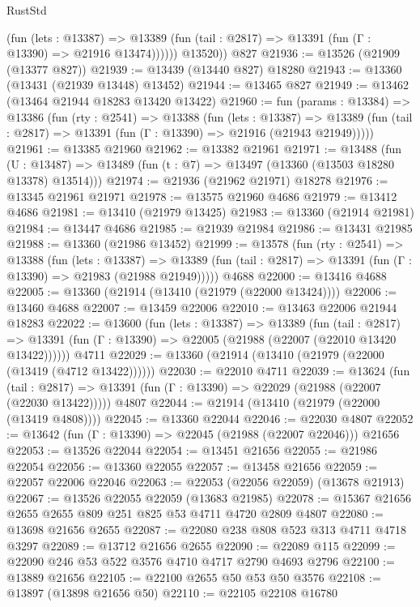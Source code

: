 \begin{lexlean}{RustStd}
\begin{coremodule}
              (fun (lets : @13387) =>
              @13389 (fun (tail : @2817) => @13391 (fun (Γ : @13390) => @21916 @13474))))))
        @13520))
    @827
@21936 := @13526 (@21909 (@13377 @827))
@21939 := @13439 (@13440 @827) @18280
@21943 := @13360 (@13431 (@21939 @13448) @13452)
@21944 := @13465 @827
@21949 := @13462 (@13464 @21944 @18283 @13420 @13422)
@21960 := fun (params : @13384) =>
  @13386
    (fun (rty : @2541) =>
    @13388
      (fun (lets : @13387) =>
      @13389 (fun (tail : @2817) => @13391 (fun (Γ : @13390) => @21916 (@21943 @21949)))))
@21961 := @13385 @21960
@21962 := @13382 @21961
@21971 := @13488
    (fun (U : @13487) => @13489 (fun (t : @7) => @13497 (@13360 (@13503 @18280 @13378) @13514)))
@21974 := @21936 (@21962 @21971) @18278
@21976 := @13345 @21961 @21971
@21978 := @13575 @21960 @4686
@21979 := @13412 @4686
@21981 := @13410 (@21979 @13425)
@21983 := @13360 (@21914 @21981)
@21984 := @13447 @4686
@21985 := @21939 @21984
@21986 := @13431 @21985
@21988 := @13360 (@21986 @13452)
@21999 := @13578
    (fun (rty : @2541) =>
    @13388
      (fun (lets : @13387) =>
      @13389 (fun (tail : @2817) => @13391 (fun (Γ : @13390) => @21983 (@21988 @21949)))))
    @4688
@22000 := @13416 @4688
@22005 := @13360 (@21914 (@13410 (@21979 (@22000 @13424))))
@22006 := @13460 @4688
@22007 := @13459 @22006
@22010 := @13463 @22006 @21944 @18283
@22022 := @13600
    (fun (lets : @13387) =>
    @13389
      (fun (tail : @2817) =>
      @13391 (fun (Γ : @13390) => @22005 (@21988 (@22007 (@22010 @13420 @13422))))))
    @4711
@22029 := @13360 (@21914 (@13410 (@21979 (@22000 (@13419 (@4712 @13422))))))
@22030 := @22010 @4711
@22039 := @13624
    (fun (tail : @2817) => @13391 (fun (Γ : @13390) => @22029 (@21988 (@22007 (@22030 @13422)))))
    @4807
@22044 := @21914 (@13410 (@21979 (@22000 (@13419 @4808))))
@22045 := @13360 @22044
@22046 := @22030 @4807
@22052 := @13642 (fun (Γ : @13390) => @22045 (@21988 (@22007 @22046))) @21656
@22053 := @13526 @22044
@22054 := @13451 @21656
@22055 := @21986 @22054
@22056 := @13360 @22055
@22057 := @13458 @21656
@22059 := @22057 @22006 @22046
@22063 := @22053 (@22056 @22059) (@13678 @21913)
@22067 := @13526 @22055 @22059 (@13683 @21985)
@22078 := @15367 @21656 @2655 @2655 @809 @251 @825 @53 @4711 @4720 @2809 @4807
@22080 := @13698 @21656 @2655
@22087 := @22080 @238 @808 @523 @313 @4711 @4718 @3297
@22089 := @13712 @21656 @2655
@22090 := @22089 @115
@22099 := @22090 @246 @53 @522 @3576 @4710 @4717 @2790 @4693 @2796
@22100 := @13889 @21656
@22105 := @22100 @2655 @50 @53 @50 @3576
@22108 := @13897 (@13898 @21656 @50)
@22110 := @22105 @22108 @16780

\end{coremodule}
\end{lexlean}
